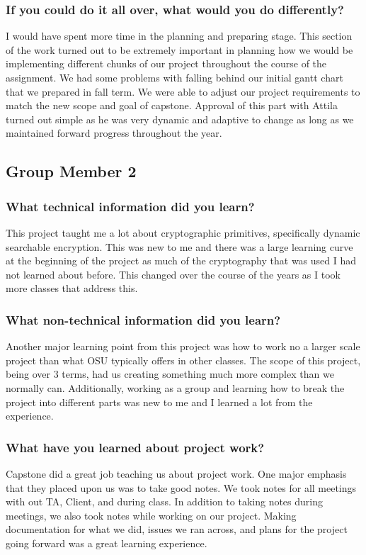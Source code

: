 \subsubsection{If you could do it all over, what would you do differently?}
I would have spent more time in the planning and preparing stage. This section of the work turned out to be extremely important in planning how we would be implementing different chunks of our project throughout the course of the assignment. We had some problems with falling behind our initial gantt chart that we prepared in fall term. We were able to adjust our project requirements to match the new scope and goal of capstone. Approval of this part with Attila turned out simple as he was very dynamic and adaptive to change as long as we maintained forward progress throughout the year.

\subsection{Group Member 2}

\subsubsection{What technical information did you learn?}
This project taught me a lot about cryptographic primitives, specifically dynamic searchable encryption. This was new to me and there was a large learning curve at the beginning of the project as much of the cryptography that was used I had not learned about before. This changed over the course of the years as I took more classes that address this.

\subsubsection{What non-technical information did you learn?}
Another major learning point from this project was how to work no a larger scale project than what OSU typically offers in other classes. The scope of this project, being over 3 terms, had us creating something much more complex than we normally can. Additionally, working as a group and learning how to break the project into different parts was new to me and I learned a lot from the experience.

\subsubsection{What have you learned about project work?}
Capstone did a great job teaching us about project work. One major emphasis that they placed upon us was to take good notes. We took notes for all meetings with out TA, Client, and during class. In addition to taking notes during meetings, we also took notes while working on our project. Making documentation for what we did, issues we ran across, and plans for the project going forward was a great learning experience.

